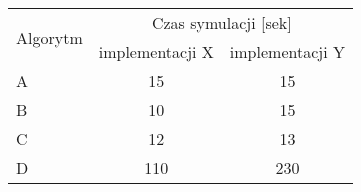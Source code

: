 \begin{center}
  \begin{tabular}{ | l || c | c | }
    \hline
    \multirow{2}{*}{Algorytm} & \multicolumn{2}{|c|}{Czas symulacji [sek]} \\
     & implementacji X & implementacji Y \\
    \hline \hline
    A & 15 & 15 \\
    \hline
    B & 10 & 15 \\
    \hline
    C & 12 & 13 \\
    \hline
    D & 110 & 230 \\
    \hline
  \end{tabular}
\end{center}

